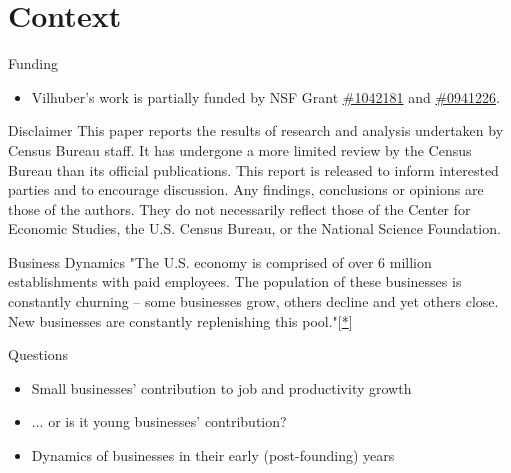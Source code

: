\section{Context}
\begin{frame}
\begin{block}{Funding}
\begin{itemize}
\item Vilhuber's work is partially funded by NSF Grant 
\href{http://www.nsf.gov/awardsearch/showAward.do?AwardNumber=1042181}{\#1042181} 
and 
\href{http://www.nsf.gov/awardsearch/showAward.do?AwardNumber=0941226}{\#0941226}. 
\end{itemize}
\end{block}
\begin{block}{Disclaimer}
\small
This paper reports the results of research and analysis 
undertaken by Census Bureau staff. It has undergone a more limited review by the Census Bureau than its 
official publications. This report is released to inform interested parties and to encourage discussion. Any 
findings, conclusions or opinions are those of the authors. They do not necessarily reflect those of the Center for 
Economic Studies, the U.S. Census Bureau, or the National Science Foundation. 
\end{block}
\end{frame}


\begin{frame}
\begin{block}{Business Dynamics}
"The U.S. economy is comprised of over 6 million establishments with paid employees. The population of these businesses is constantly churning -- some businesses grow, others decline and yet others close. New businesses are constantly replenishing this pool."[\href{https://www.census.gov/ces/dataproducts/bds/overview.html}{*}]
\end{block}
\begin{block}{Questions}
\begin{itemize}
\item Small businesses' contribution to job and productivity growth 
\item ... or is it \alert{young} businesses' contribution?
\item Dynamics of businesses in their early (post-founding) years
\end{itemize}
\end{block}
\end{frame}

